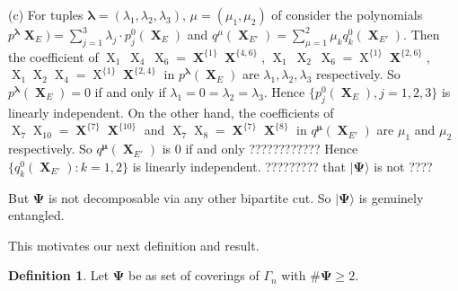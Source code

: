 \documentclass[a4paper,12pt]{article}
\DeclareMathOperator{\x}{\mathrm{X}}
\theoremstyle{definition}
\theoremstyle{underlinethm}
\newtheorem{definition}{Definition}[section]
\theoremstyle{definition}
\begin{document}
 (c) For tuples $\boldsymbol{\lambda} = (\lambda_{1}, \lambda_{2}, \lambda_{3})$, $\mu =(\mu_{1}, \mu_{2})$ of consider the polynomials $p^{\boldsymbol{\lambda}}{\boldsymbol{\x}_{E}}) = \sum\limits_{j=1}^{3} \lambda_{j} \cdot p_{j}^{0} (\boldsymbol{\x}_{E})$ and $q^{\mu}(\boldsymbol{\x}_{E'}) = \sum\limits_{\mu =1}^{2} \mu_{k} q_{k}^{0} (\boldsymbol{\x}_{E'})$. Then the coefficient of $\x_{1}~ \x_{4}~\x_{6} = \boldsymbol{\x}^{\{1\}} \boldsymbol{\x}^{\{4,6\}}$, $\x_{1}~ \x_{2} ~\x_{6} = \x^{\{1\}} \boldsymbol{\x}^{\{2,6\}}$, $\x_{1} \x_{2} \x_{4} = \x^{\{1\}} \boldsymbol{\x}^{\{2,4\}}$ in $p^{\boldsymbol{\lambda}}(\boldsymbol{\x}_{E})$ are $\lambda_{1}, \lambda_{2}, \lambda_{3}$ respectively. So $p^{\boldsymbol{\lambda}}(\boldsymbol{\x}_{E}) =0$ if and only if $\lambda_{1} = 0 = \lambda_{2} = \lambda_{3}$. Hence $\{p_{j}^{0}(\boldsymbol{\x}_{E}), j = 1, 2, 3\}$  is linearly independent. On the other hand, the coefficients of $\x_{7} \x_{10} = \boldsymbol{\x}^{\{7\}} \boldsymbol{\x}^{\{10\}}$ and $\x_{7} \x_{8} = \boldsymbol{\x}^{\{7\}} \boldsymbol{\x}^{\{8\}}$ in $q^{\boldsymbol{\mu}}(\boldsymbol{\x}_{E'})$ are $\mu_{1}$ and $\mu_{2}$ respectively. So $q^{\boldsymbol{\mu}} (\boldsymbol{\x}_{E'})$ is $0$ if and only ???????????? Hence $\{q_{k}^{0}(\boldsymbol{\x}_{E'}): k = 1,2\}$ is linearly independent. ????????? that $| \boldsymbol{\Psi} \rangle$ is not ????
 
 But $\boldsymbol{\Psi}$ is not decomposable via any other bipartite cut. So $| \boldsymbol{\Psi} \rangle$ is genuinely entangled.
 
 This motivates our next definition and result.
 
\begin{definition}\label{definition-3.3}
Let $\boldsymbol{\Psi}$ be as set of coverings of $\Gamma_{n}$ with $\# \boldsymbol{\Psi} \geq 2$.
\end{definition}
\end{document}
